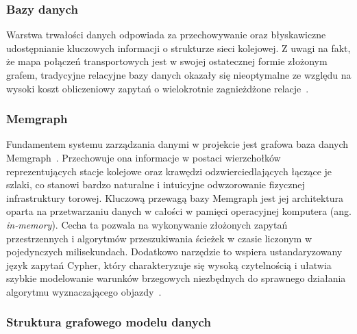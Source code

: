 \documentclass[twoside]{projektInzynierskiMS1z}
\begin{document}
\subsubsection{Bazy danych}

Warstwa trwałości danych odpowiada za przechowywanie oraz błyskawiczne udostępnianie
kluczowych informacji o strukturze sieci kolejowej. Z uwagi na fakt, że mapa połączeń
transportowych jest w swojej ostatecznej formie złożonym grafem, tradycyjne relacyjne
bazy danych okazały się nieoptymalne ze względu na wysoki koszt obliczeniowy zapytań
o wielokrotnie zagnieżdżone relacje~\cite{graphdatabases}.

\subsubsection{Memgraph}

Fundamentem systemu zarządzania danymi w projekcie jest grafowa baza danych
Memgraph~\cite{memgraph}. Przechowuje ona informacje w postaci wierzchołków
reprezentujących stacje kolejowe oraz krawędzi odzwierciedlających łączące je szlaki,
co stanowi bardzo naturalne i intuicyjne odwzorowanie fizycznej infrastruktury torowej.
Kluczową przewagą bazy Memgraph jest jej architektura oparta na przetwarzaniu danych
w całości w pamięci operacyjnej komputera (ang. \emph{in-memory}). Cecha ta pozwala na
wykonywanie złożonych zapytań przestrzennych i algorytmów przeszukiwania ścieżek
w czasie liczonym w pojedynczych milisekundach. Dodatkowo narzędzie to wspiera
ustandaryzowany język zapytań Cypher, który charakteryzuje się wysoką czytelnością
i ułatwia szybkie modelowanie warunków brzegowych niezbędnych do sprawnego działania
algorytmu wyznaczającego objazdy~\cite{cypher}.

\subsubsection{Struktura grafowego modelu danych}
\end{document}

